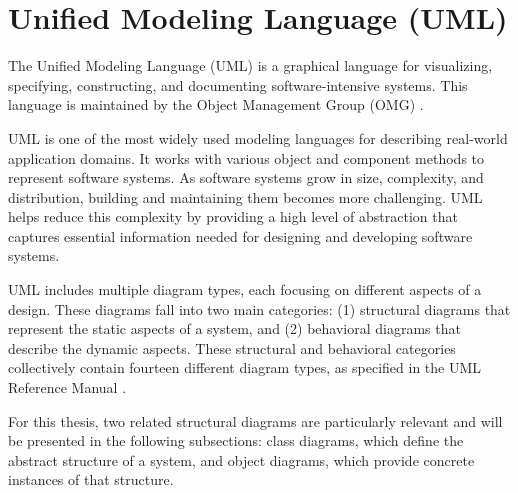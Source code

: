 \section{Unified Modeling Language (UML)}

\hspace{1cm} The Unified Modeling Language (UML) is a graphical language for 
visualizing, specifying, constructing, and documenting software-intensive systems. 
This language is maintained by the Object Management Group (OMG) \cite{UML}.

UML is one of the most widely used modeling languages for describing real-world 
application domains. It works with various object and component methods to represent 
software systems. As software systems grow in size, complexity, and distribution, 
building and maintaining them becomes more challenging. UML helps reduce this 
complexity by providing a high level of abstraction that captures essential 
information needed for designing and developing software systems.

UML includes multiple diagram types, each focusing on different aspects of a design. 
These diagrams fall into two main categories: (1) structural diagrams that represent 
the static aspects of a system, and (2) behavioral diagrams that describe the dynamic 
aspects. These structural and behavioral categories collectively contain fourteen 
different diagram types, as specified in the UML Reference Manual \cite{UML_Reference_Manual}.

For this thesis, two related structural diagrams are particularly relevant and will be presented in the following subsections: class diagrams, which define the abstract structure of a system, and object diagrams, which provide concrete instances of that structure.

